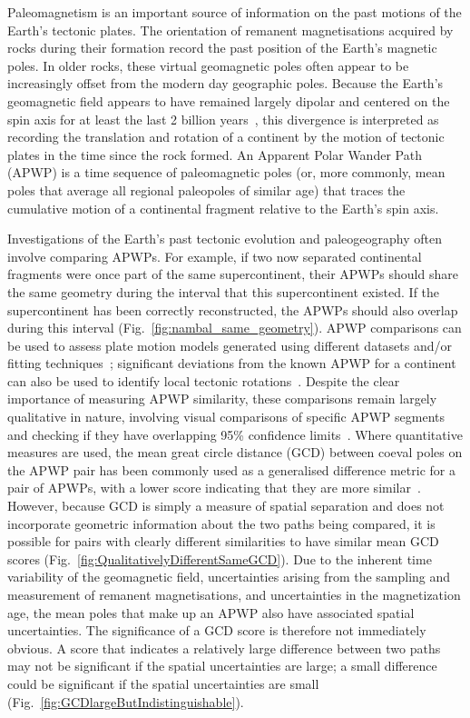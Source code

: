 Paleomagnetism is an important source of information on the past motions of the
Earth's tectonic plates. The orientation of remanent magnetisations acquired by
rocks during their formation record the past position of the Earth's magnetic
poles. In older rocks, these virtual geomagnetic poles often appear to be
increasingly offset from the modern day geographic poles. Because the Earth's
geomagnetic field appears to have remained largely dipolar and centered on the
spin axis for at least the last 2 billion years~\citep{E06}, this divergence is
interpreted as recording the translation and rotation of a continent by the
motion of tectonic plates in the time since the rock formed. An Apparent Polar
Wander Path (APWP) is a time sequence of paleomagnetic poles (or, more commonly,
mean poles that average all regional paleopoles of similar age) that traces
the cumulative motion of a continental fragment relative to the Earth's spin
axis.

Investigations of the Earth's past tectonic evolution and paleogeography often
involve comparing APWPs. For example, if two now separated continental fragments
were once part of the same supercontinent, their APWPs should share the same
geometry during the interval that this supercontinent existed. If the
supercontinent has been correctly reconstructed, the APWPs should also overlap
during this interval (Fig.~\ref{fig:nambal_same_geometry}). APWP comparisons can
be used to assess plate motion models generated using different datasets and/or
fitting techniques~\cite[for example]{B02,B07,S07,T08,D11}; significant
deviations from the known APWP for a continent can also be used to identify
local tectonic rotations~\cite[for example]{G10,Ch13}. Despite the clear
importance of measuring APWP similarity, these comparisons remain largely
qualitative in nature, involving visual comparisons of specific APWP segments
and checking if they have overlapping 95\% confidence limits~\cite[for
example]{B02,B07,G10,D11}. Where quantitative measures are used, the mean great
circle distance (GCD) between coeval poles on the APWP pair has been commonly
used as a generalised difference metric for a pair of APWPs, with a lower score
indicating that they are more similar~\cite[for example]{S07,T08}. However,
because GCD is simply a measure of spatial separation and does not incorporate
geometric information about the two paths being compared, it is possible for
pairs with clearly different similarities to have similar mean GCD scores
(Fig.~\ref{fig:QualitativelyDifferentSameGCD}). Due to the inherent time
variability of the geomagnetic field, uncertainties arising from the sampling
and measurement of remanent magnetisations, and uncertainties in the
magnetization age, the mean poles that make up an APWP also have associated
spatial uncertainties. The significance of a GCD score is therefore not
immediately obvious. A score that indicates a relatively large difference
between two paths may not be significant if the spatial uncertainties are large;
a small difference could be significant if the spatial uncertainties are small
(Fig.~\ref{fig:GCDlargeButIndistinguishable}).


